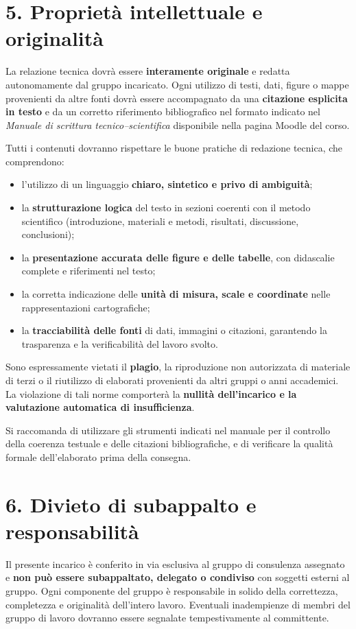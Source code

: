 \documentclass[11pt,a4paper,roman]{moderncv}
\begin{document}
\section*{5. Proprietà intellettuale e originalità}
La relazione tecnica dovrà essere \textbf{interamente originale} e redatta autonomamente dal gruppo incaricato.  
Ogni utilizzo di testi, dati, figure o mappe provenienti da altre fonti dovrà essere accompagnato da una \textbf{citazione esplicita in testo} e da un corretto riferimento bibliografico nel formato indicato nel \textit{Manuale di scrittura tecnico–scientifica} disponibile nella pagina Moodle del corso.

Tutti i contenuti dovranno rispettare le buone pratiche di redazione tecnica, che comprendono:
\begin{itemize}
  \item l’utilizzo di un linguaggio \textbf{chiaro, sintetico e privo di ambiguità};
  \item la \textbf{strutturazione logica} del testo in sezioni coerenti con il metodo scientifico (introduzione, materiali e metodi, risultati, discussione, conclusioni);
  \item la \textbf{presentazione accurata delle figure e delle tabelle}, con didascalie complete e riferimenti nel testo;
  \item la corretta indicazione delle \textbf{unità di misura, scale e coordinate} nelle rappresentazioni cartografiche;
  \item la \textbf{tracciabilità delle fonti} di dati, immagini o citazioni, garantendo la trasparenza e la verificabilità del lavoro svolto.
\end{itemize}

Sono espressamente vietati il \textbf{plagio}, la riproduzione non autorizzata di materiale di terzi o il riutilizzo di elaborati provenienti da altri gruppi o anni accademici.  
La violazione di tali norme comporterà la \textbf{nullità dell’incarico e la valutazione automatica di insufficienza}.

Si raccomanda di utilizzare gli strumenti indicati nel manuale per il controllo della coerenza testuale e delle citazioni bibliografiche, e di verificare la qualità formale dell’elaborato prima della consegna.

\section*{6. Divieto di subappalto e responsabilità}
Il presente incarico è conferito in via esclusiva al gruppo di consulenza assegnato e \textbf{non può essere subappaltato, delegato o condiviso} con soggetti esterni al gruppo.  
Ogni componente del gruppo è responsabile in solido della correttezza, completezza e originalità dell'intero lavoro. Eventuali inadempienze di membri del gruppo di lavoro dovranno essere segnalate tempestivamente al committente.
\end{document}
